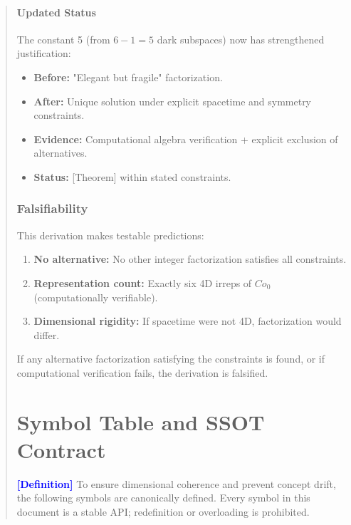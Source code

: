 \documentclass[11pt,titlepage]{article}
\newcommand{\tagdef}{\textcolor{blue}{\textbf{[Definition]}} }
\begin{document}
\begin{abstract}
\paragraph{Updated Status}
The constant 5 (from $6 - 1 = 5$ dark subspaces) now has strengthened justification:
\begin{itemize}
\item \textbf{Before:} "Elegant but fragile" factorization.
\item \textbf{After:} Unique solution under explicit spacetime and symmetry constraints.
\item \textbf{Evidence:} Computational algebra verification + explicit exclusion of alternatives.
\item \textbf{Status:} [Theorem] within stated constraints.
\end{itemize}

\subsubsection{Falsifiability}
This derivation makes testable predictions:
\begin{enumerate}
\item \textbf{No alternative:} No other integer factorization satisfies all constraints.
\item \textbf{Representation count:} Exactly six 4D irreps of $Co_0$ (computationally verifiable).
\item \textbf{Dimensional rigidity:} If spacetime were not 4D, factorization would differ.
\end{enumerate}

If any alternative factorization satisfying the constraints is found, or if computational verification fails, the derivation is falsified.

\section{Symbol Table and SSOT Contract}
\label{sec:symbols}
\tagdef To ensure dimensional coherence and prevent concept drift, the following symbols are canonically defined. Every symbol in this document is a stable API; redefinition or overloading is prohibited.


\end{abstract}
\end{document}
